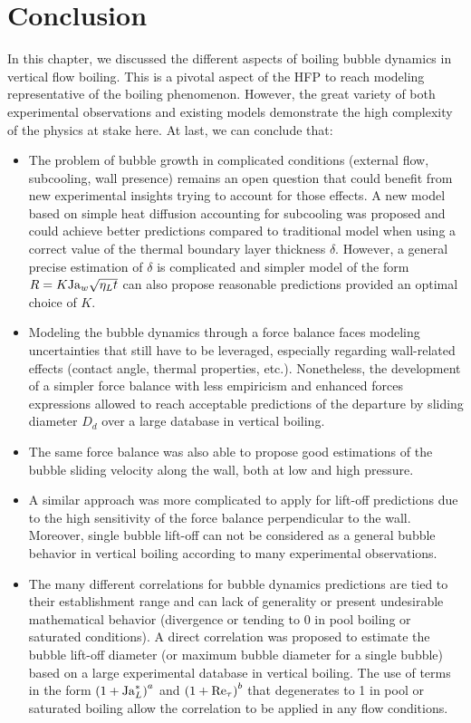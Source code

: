 \section{Conclusion}


In this chapter, we discussed the different aspects of boiling bubble dynamics in vertical flow boiling. This is a pivotal aspect of the HFP to reach modeling representative of the boiling phenomenon. However, the great variety of both experimental observations and existing models demonstrate the high complexity of the physics at stake here. At last, we can conclude that:

\begin{itemize}
\item The problem of bubble growth in complicated conditions (external flow, subcooling, wall presence) remains an open question that could benefit from new experimental insights trying to account for those effects. A new model based on simple heat diffusion accounting for subcooling was proposed and could achieve better predictions compared to traditional model when using a correct value of the thermal boundary layer thickness $\delta$. However, a general precise estimation of $\delta$ is complicated and simpler model of the form $R = K \mathrm{Ja}_{w}\sqrt{\eta_{L}t}$ can also propose reasonable predictions provided an optimal choice of $K$. 

\item Modeling the bubble dynamics through a force balance faces modeling uncertainties that still have to be leveraged, especially regarding wall-related effects (contact angle, thermal properties, etc.). Nonetheless, the development of a simpler force balance with less empiricism and enhanced forces expressions allowed to reach acceptable predictions of the departure by sliding diameter $D_{d}$ over a large database in vertical boiling.

\item The same force balance was also able to propose good estimations of the bubble sliding velocity along the wall, both at low and high pressure.

\item A similar approach was more complicated to apply for lift-off predictions due to the high sensitivity of the  force balance perpendicular to the wall. Moreover, single bubble lift-off can not be considered as a general bubble behavior in vertical boiling according to many experimental observations.

\item The many different correlations for bubble dynamics predictions are tied to their establishment range and can lack of generality or present undesirable mathematical behavior (\eg divergence or tending to 0 in pool boiling or saturated conditions). A direct correlation was proposed to estimate the bubble lift-off diameter (or maximum bubble diameter for a single bubble) based on a large experimental database in vertical boiling. The use of terms in the form $\left( 1+\mathrm{Ja}_{L}^{*} \right)^{a}$ and $\left( 1+\mathrm{Re}_{\tau} \right)^{b}$ that degenerates to 1 in pool or saturated boiling allow the correlation to be applied in any flow conditions.
\end{itemize}




